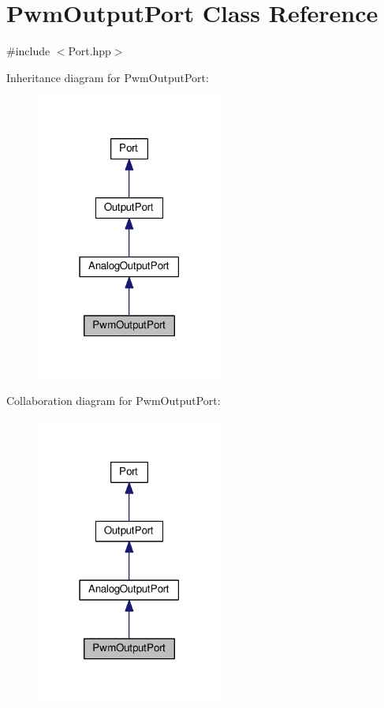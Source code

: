 \hypertarget{classPwmOutputPort}{}\section{Pwm\+Output\+Port Class Reference}
\label{classPwmOutputPort}


{\ttfamily \#include $<$Port.\+hpp$>$}



Inheritance diagram for Pwm\+Output\+Port\+:\nopagebreak
\begin{figure}[H]
\begin{center}
\leavevmode
\includegraphics[width=174pt]{classPwmOutputPort__inherit__graph}
\end{center}
\end{figure}


Collaboration diagram for Pwm\+Output\+Port\+:\nopagebreak
\begin{figure}[H]
\begin{center}
\leavevmode
\includegraphics[width=174pt]{classPwmOutputPort__coll__graph}
\end{center}
\end{figure}
